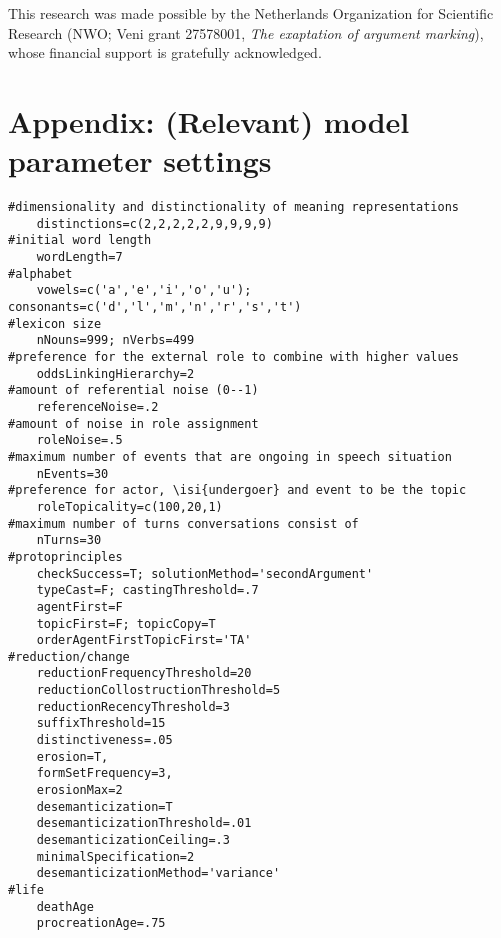 \documentclass[output=paper]{LSP/langsci}
\begin{document}
This research was made possible by the Netherlands Organization for Scientific Research (NWO; Veni grant 27578001, \textit{The exaptation of argument marking}), whose financial support is gratefully acknowledged. 

\section*{Appendix: (Relevant) model parameter settings}
\begin{lstlisting}
#dimensionality and distinctionality of meaning representations
	distinctions=c(2,2,2,2,2,9,9,9,9)
#initial word length
	wordLength=7
#alphabet
	vowels=c('a','e','i','o','u'); consonants=c('d','l','m','n','r','s','t')
#lexicon size
	nNouns=999; nVerbs=499
#preference for the external role to combine with higher values
	oddsLinkingHierarchy=2
#amount of referential noise (0--1)
	referenceNoise=.2
#amount of noise in role assignment
	roleNoise=.5
#maximum number of events that are ongoing in speech situation
	nEvents=30
#preference for actor, \isi{undergoer} and event to be the topic
	roleTopicality=c(100,20,1)
#maximum number of turns conversations consist of
	nTurns=30
#protoprinciples
	checkSuccess=T; solutionMethod='secondArgument'
	typeCast=F; castingThreshold=.7
	agentFirst=F
	topicFirst=F; topicCopy=T
	orderAgentFirstTopicFirst='TA'
#reduction/change
	reductionFrequencyThreshold=20
	reductionCollostructionThreshold=5
	reductionRecencyThreshold=3
	suffixThreshold=15
	distinctiveness=.05
	erosion=T,	
	formSetFrequency=3,
	erosionMax=2
	desemanticization=T
	desemanticizationThreshold=.01	
	desemanticizationCeiling=.3
	minimalSpecification=2
	desemanticizationMethod='variance'
#life
	deathAge
	procreationAge=.75
\end{lstlisting}

{\sloppy
\printbibliography[heading=subbibliography,notkeyword=this]
}
\end{document}
